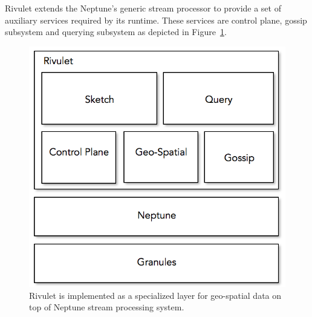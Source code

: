 Rivulet extends the Neptune's generic stream processor to provide a set of auxiliary services required by its runtime.
These services are control plane, gossip subsystem and querying subsystem as depicted in Figure~\ref{fig:rivulet-archi}.
%
\begin{figure}
    \centerline{\includegraphics[scale=0.5]{figures/rivulet-archi.png}}
    \caption{Rivulet is implemented as a specialized layer for geo-spatial data on top of Neptune stream processing system.}
    \label{fig:rivulet-archi}
\end{figure}
%
